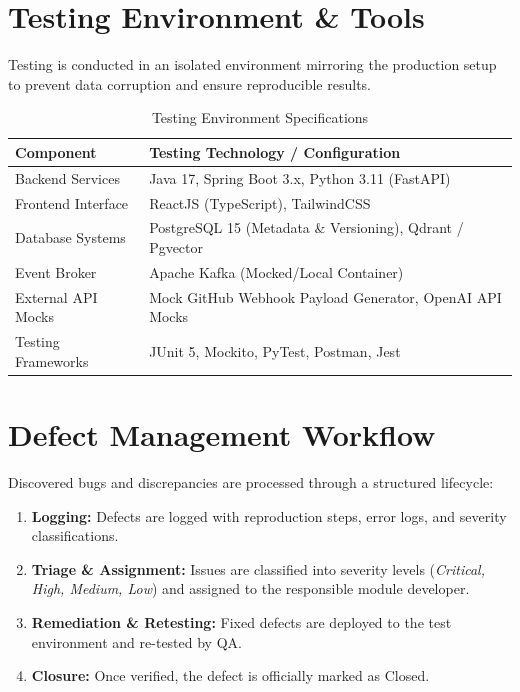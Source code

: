 \section{Testing Environment \& Tools}

Testing is conducted in an isolated environment mirroring the production setup to prevent data corruption and ensure reproducible results.

\begin{table}[h!]
\centering
\small
\caption{Testing Environment Specifications}
\vspace{0.5em}
\begin{tabularx}{\textwidth}{|l|X|}
\hline
\textbf{Component} & \textbf{Testing Technology / Configuration} \\ \hline
Backend Services & Java 17, Spring Boot 3.x, Python 3.11 (FastAPI) \\ \hline
Frontend Interface & ReactJS (TypeScript), TailwindCSS \\ \hline
Database Systems & PostgreSQL 15 (Metadata \& Versioning), Qdrant / Pgvector \\ \hline
Event Broker & Apache Kafka (Mocked/Local Container) \\ \hline
External API Mocks & Mock GitHub Webhook Payload Generator, OpenAI API Mocks \\ \hline
Testing Frameworks & JUnit 5, Mockito, PyTest, Postman, Jest \\ \hline
\end{tabularx}
\end{table}

\section{Defect Management Workflow}

Discovered bugs and discrepancies are processed through a structured lifecycle:
\begin{enumerate}
    \item \textbf{Logging:} Defects are logged with reproduction steps, error logs, and severity classifications.
    \item \textbf{Triage \& Assignment:} Issues are classified into severity levels (\textit{Critical, High, Medium, Low}) and assigned to the responsible module developer.
    \item \textbf{Remediation \& Retesting:} Fixed defects are deployed to the test environment and re-tested by QA.
    \item \textbf{Closure:} Once verified, the defect is officially marked as Closed.
\end{enumerate}

